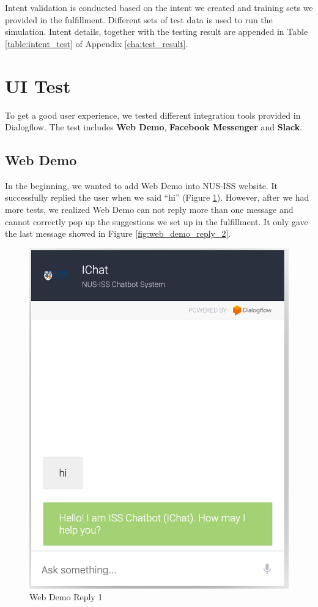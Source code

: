	Intent validation is conducted based on the intent we created and training sets we provided in the fulfillment. Different sets of test data is used to run the simulation. Intent details, together with the testing result are appended in Table \ref{table:intent_test} of Appendix \ref{cha:test_result}.

\section{UI Test} %
\label{sec:ui_test}
	To get a good user experience, we tested different integration tools \cite{integrations} provided in Dialogflow. The test includes \textbf{Web Demo}, \textbf{Facebook Messenger} and \textbf{Slack}.

	\subsection{Web Demo} %
	\label{sub:web_demo}
		In the beginning, we wanted to add Web Demo into NUS-ISS website. It successfully replied the user when we said ``hi'' (Figure \ref{fig:web_demo_reply_1}). However, after we had more tests, we realized Web Demo can not reply more than one message and cannot correctly pop up the suggestions we set up in the fulfillment. It only gave the last message showed in Figure \ref{fig:web_demo_reply_2}.

		\begin{figure}[h]
			\centering
			\includegraphics[width=\linewidth/3]{img/webdemo_1.png}
			\caption{Web Demo Reply 1}
			\label{fig:web_demo_reply_1}
		\end{figure}

